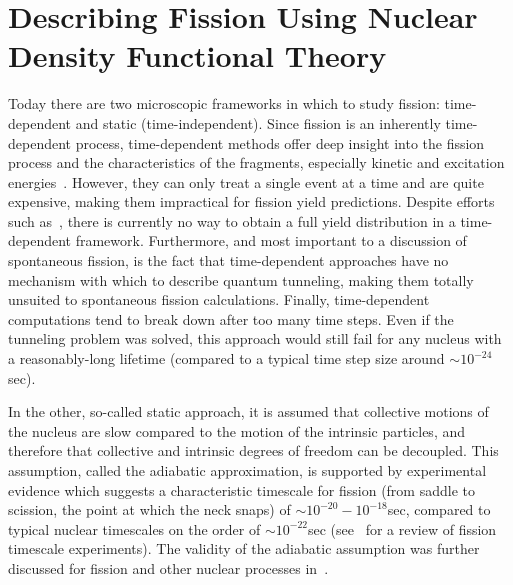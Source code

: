 \chapter{Describing Fission Using Nuclear Density Functional Theory}\label{chap:Model}


Today there are two microscopic frameworks in which to study fission: time-dependent and static (time-independent). Since fission is an inherently time-dependent process, time-dependent methods offer deep insight into the fission process and the characteristics of the fragments, especially kinetic and excitation energies~\cite{Scamps2018, Scamps2015a, Simenel2014, Grineviciute2018, Umar2010}. However, they can only treat a single event at a time and are quite expensive, making them impractical for fission yield predictions. Despite efforts such as~\cite{Scamps2015, Bulgac2018}, there is currently no way to obtain a full yield distribution in a time-dependent framework. Furthermore, and most important to a discussion of spontaneous fission, is the fact that time-dependent approaches have no mechanism with which to describe quantum tunneling, making them totally unsuited to spontaneous fission calculations. Finally, time-dependent computations tend to break down after too many time steps. Even if the tunneling problem was solved, this approach would still fail for any nucleus with a reasonably-long lifetime (compared to a typical time step size around ${\sim}10^{-24}$ sec).

In the other, so-called static approach, it is assumed that collective motions of the nucleus are slow compared to the motion of the intrinsic particles, and therefore that collective and intrinsic degrees of freedom can be decoupled. This assumption, called the adiabatic approximation, is supported by experimental evidence which suggests a characteristic timescale for fission (from saddle to scission, the point at which the neck snaps) of ${\sim}10^{-20}-10^{-18}$sec, compared to typical nuclear timescales on the order of ${\sim}10^{-22}$sec (see~\cite{Jacquet2009} for a review of fission timescale experiments). The validity of the adiabatic assumption was further discussed for fission and other nuclear processes in~\cite{Nazarewicz1993}.

